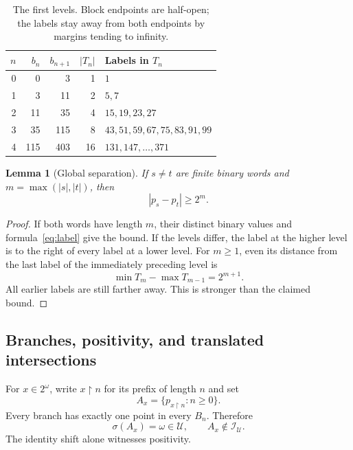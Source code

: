 \documentclass[11pt,a4paper]{article}
\newtheorem{lemma}[theorem]{Lemma}
\theoremstyle{definition}
\theoremstyle{remark}
\newcommand{\I}{\mathcal I}
\newcommand{\U}{\mathcal U}
\newcommand{\supp}{\sigma}
\newcommand{\restr}{\mathbin{\upharpoonright}}
\begin{document}
\begin{table}[htbp]
\centering
\small
\begin{tabular}{@{}rrrrl@{}}
\toprule
$n$ & $b_n$ & $b_{n+1}$ & $|T_n|$ & Labels in $T_n$\\
\midrule
0 & 0 & 3 & 1 & $1$\\
1 & 3 & 11 & 2 & $5,7$\\
2 & 11 & 35 & 4 & $15,19,23,27$\\
3 & 35 & 115 & 8 & $43,51,59,67,75,83,91,99$\\
4 & 115 & 403 & 16 & $131,147,\ldots,371$\\
\bottomrule
\end{tabular}
\caption{The first levels. Block endpoints are half-open; the labels
stay away from both endpoints by margins tending to infinity.}
\label{tab:levels}
\end{table}

\begin{lemma}[Global separation]
\label{lem:separation}
If $s\ne t$ are finite binary words and $m=\max(|s|,|t|)$, then
\begin{equation}
\label{eq:separation}
                            |p_s-p_t|\ge2^m.
\end{equation}
\end{lemma}
\begin{proof}
If both words have length $m$, their distinct binary values and
formula~\eqref{eq:label} give the bound. If the levels differ, the label
at the higher level is to the right of every label at a lower level.
For $m\ge1$, even its distance from the last label of the immediately
preceding level is
\[
                         \min T_m-\max T_{m-1}=2^{m+1}.
\]
All earlier labels are still farther away. This is stronger than the
claimed bound.
\end{proof}

\subsection{Branches, positivity, and translated intersections}
For $x\in2^\omega$, write $x\restr n$ for its prefix of length $n$ and
set
\begin{equation}
\label{eq:branch}
                       A_x=\{p_{x\restr n}:n\ge0\}.
\end{equation}
Every branch has exactly one point in every $B_n$. Therefore
\begin{equation}
\label{eq:positive}
                         \supp(A_x)=\omega\in\U,
                 \qquad A_x\notin\I_\U.
\end{equation}
The identity shift alone witnesses positivity.
\end{document}
